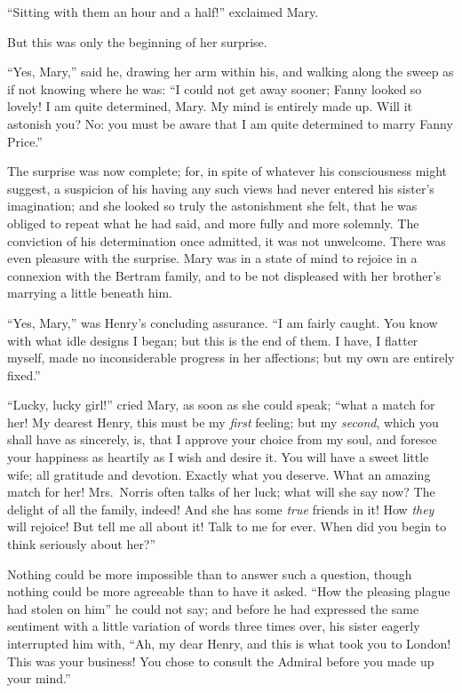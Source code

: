 \documentclass{article}
\begin{document}
``Sitting with them an hour and a half!'' exclaimed Mary.

But this was only the beginning of her surprise.

``Yes, Mary,'' said he, drawing her arm within his,
and walking along the sweep as if not knowing where he was:
``I could not get away sooner; Fanny looked so lovely!
I am quite determined, Mary.  My mind is entirely made up.
Will it astonish you?  No: you must be aware that I am quite
determined to marry Fanny Price.''

The surprise was now complete; for, in spite of whatever
his consciousness might suggest, a suspicion of his having
any such views had never entered his sister's imagination;
and she looked so truly the astonishment she felt, that he
was obliged to repeat what he had said, and more fully
and more solemnly.  The conviction of his determination
once admitted, it was not unwelcome.  There was even
pleasure with the surprise.  Mary was in a state of mind
to rejoice in a connexion with the Bertram family,
and to be not displeased with her brother's marrying
a little beneath him.

``Yes, Mary,'' was Henry's concluding assurance.  ``I am
fairly caught.  You know with what idle designs I began;
but this is the end of them.  I have, I flatter myself,
made no inconsiderable progress in her affections;
but my own are entirely fixed.''

``Lucky, lucky girl!'' cried Mary, as soon as she could speak;
``what a match for her!  My dearest Henry, this must
be my \emph{first} feeling; but my \emph{second}, which you shall
have as sincerely, is, that I approve your choice from
my soul, and foresee your happiness as heartily as I
wish and desire it.  You will have a sweet little wife;
all gratitude and devotion.  Exactly what you deserve.
What an amazing match for her!  Mrs.\ Norris often talks
of her luck; what will she say now?  The delight of all
the family, indeed!  And she has some \emph{true} friends in it!
How \emph{they} will rejoice!  But tell me all about it!
Talk to me for ever.  When did you begin to think seriously
about her?''

Nothing could be more impossible than to answer such
a question, though nothing could be more agreeable than
to have it asked.  ``How the pleasing plague had stolen
on him'' he could not say; and before he had expressed
the same sentiment with a little variation of words
three times over, his sister eagerly interrupted him with,
``Ah, my dear Henry, and this is what took you to London!
This was your business!  You chose to consult the Admiral
before you made up your mind.''
\end{document}
